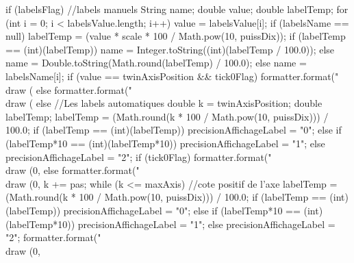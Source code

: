 \begin{code}
\begin{hide}
{{         if (labelsFlag) {
            //labels manuels
            String name;
            double value;
            double labelTemp;
            for (int i = 0; i < labelsValue.length; i++) {
               value = labelsValue[i];
               if (labelsName == null) {
                  labelTemp = (value * scale * 100 / Math.pow(10, puissDix));
                  if (labelTemp == (int)(labelTemp))
                     name = Integer.toString((int)(labelTemp / 100.0));
                  else
                     name = Double.toString(Math.round(labelTemp) / 100.0);
               } else
                  name = labelsName[i];
               if (value == twinAxisPosition && tick0Flag)
                  formatter.format("\\draw (%
               else
                  formatter.format("\\draw (%
            }
         } else {
            //Les labels automatiques
            double k = twinAxisPosition;
            double labelTemp;
            labelTemp = (Math.round(k * 100 / Math.pow(10, puissDix))) / 100.0;
            if (labelTemp == (int)(labelTemp))
               precisionAffichageLabel = "0";
            else if (labelTemp*10 == (int)(labelTemp*10))
               precisionAffichageLabel = "1";
            else
               precisionAffichageLabel = "2";
            if (tick0Flag)
               formatter.format("\\draw (0,%
            else
               formatter.format("\\draw (0,%
            k += pas;
            while (k <= maxAxis) { //cote positif de l'axe
               labelTemp = (Math.round(k * 100 / Math.pow(10, puissDix))) / 100.0;
               if (labelTemp == (int)(labelTemp))
                  precisionAffichageLabel = "0";
               else if (labelTemp*10 == (int)(labelTemp*10))
                  precisionAffichageLabel = "1";
               else
                  precisionAffichageLabel = "2";
               formatter.format("\\draw (0,%
}}}}
\end{hide}
\end{code}
